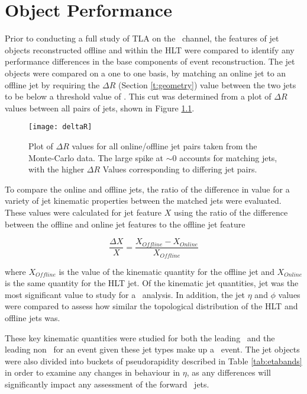 \chapter{Object Performance}\label{c:OP}

Prior to conducting a full study of TLA on the \VBFHBB\, channel, the features of jet objects reconstructed offline and within the HLT were compared to identify any performance differences in the base components of event reconstruction. The jet objects were compared on a one to one basis, by matching an online jet to an offline jet by requiring the $\Delta R$ (Section \ref{t:geometry}) value between the two jets to be below a threshold value of \DELTARTHRESHOLD. This cut was determined from a plot of $\Delta R$ values between all pairs of jets, shown in Figure \ref{f:deltaR}.

\begin{figure}[h]
	\centering
	\texttt{[image: deltaR]}
	\caption{Plot of $\Delta R$ values for all online/offline jet pairs taken from the Monte-Carlo data. The large spike at $\sim0$ accounts for matching jets, with the higher $\Delta R$ Values corresponding to differing jet pairs.}
	\label{f:deltaR}
\end{figure}
To compare the online and offline jets, the ratio of the difference in value for a variety of jet kinematic properties between the matched jets were evaluated. These values were calculated for jet feature $X$ using the ratio of the difference between the offline and online jet features to the offline jet feature

	\begin{equation}
	\frac{\Delta X}{X} = \frac{X_{Offline} - X_{Online}}{X_{Offline}}
	\end{equation}

	where $X_{Offline}$ is the value of the kinematic quantity for the offline jet and $X_{Online}$ is the same quantity for  the HLT jet. Of the kinematic jet quantities, jet \pt was the most significant value to study for a \VBFHBB\ analysis. In addition, the jet $\eta$ and $\phi$ values were compared to assess how similar the topological distribution of the HLT and offline jets was.

	These key kinematic quantities were studied for both the leading \bjet\ and the leading non \bjet\ for an event given these jet types make up a \VBFHBB\ event. The jet objects were also divided into buckets of pseudorapidity described in Table \ref{tab:etabands} in order to examine any changes in behaviour in $\eta$, as any differences will significantly impact any assessment of the forward \VBFHBB\ jets.

